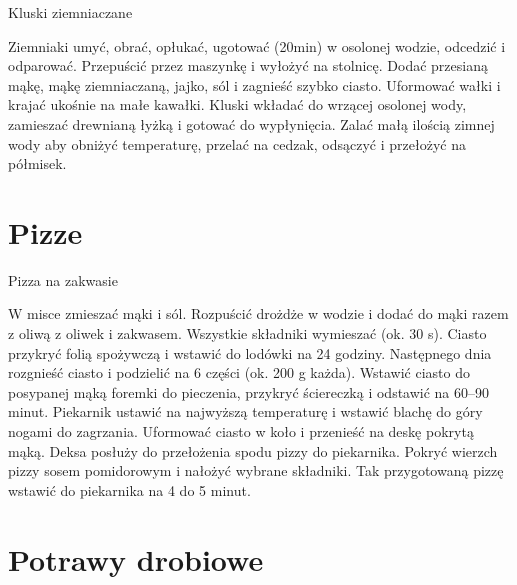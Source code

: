 \documentclass[a4paper,12pt]{article}
\begin{document}
\begin{recipe}{Kluski ziemniaczane}{}{}

Ziemniaki umyć, obrać, opłukać, ugotować (20min) w osolonej wodzie, odcedzić i
odparować. Przepuścić przez maszynkę i wyłożyć na stolnicę. Dodać przesianą
mąkę, mąkę ziemniaczaną, jajko, sól i zagnieść szybko ciasto.
\freeform%
Uformować wałki i
krajać ukośnie na małe kawałki. Kluski wkładać do wrzącej osolonej wody,
zamieszać drewnianą łyżką i gotować do wypłynięcia. Zalać małą ilością zimnej
wody aby obniżyć temperaturę, przelać na cedzak, odsączyć i przełożyć na
półmisek.

\end{recipe}


\newpage
\section{Pizze}

\begin{recipe}{Pizza na zakwasie}{}{}

W misce zmieszać mąki i sól. Rozpuścić drożdże w wodzie i dodać do mąki
razem z oliwą z oliwek i zakwasem. Wszystkie składniki wymieszać (ok. 30 s).
Ciasto przykryć folią spożywczą i wstawić do lodówki na 24 godziny.
\freeform%
Następnego dnia rozgnieść ciasto i podzielić na 6 części (ok. 200 g każda).
Wstawić ciasto do posypanej mąką foremki do pieczenia, przykryć ściereczką i
odstawić na 60--90 minut. Piekarnik ustawić na najwyższą temperaturę i wstawić
blachę do góry nogami do zagrzania. Uformować ciasto w koło i przenieść na
deskę pokrytą mąką. Deksa posłuży do przełożenia spodu pizzy do
piekarnika. Pokryć wierzch pizzy sosem pomidorowym i nałożyć wybrane składniki.
Tak przygotowaną pizzę wstawić do piekarnika na 4 do 5 minut.

\end{recipe}

\newpage
\section{Potrawy drobiowe}
\end{document}
